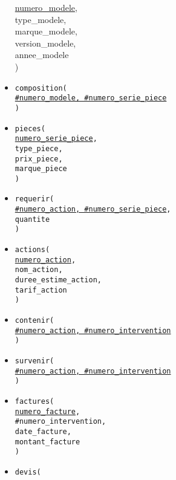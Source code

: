\documentclass[a4paper,11pt]{article} %
\begin{document}
\begin{itemize}[leftmargin=*]
{        \underline{numero\_modele}, \\
        type\_modele, \\
        marque\_modele, \\
        version\_modele, \\
        annee\_modele \\
    )}
    \item \texttt{composition( \\
        \underline{\#numero\_modele, \#numero\_serie\_piece} \\
    )}
    \item \texttt{pieces( \\
        \underline{numero\_serie\_piece}, \\
        type\_piece, \\
        prix\_piece, \\
        marque\_piece \\
    )}
    \item \texttt{requerir( \\
        \underline{\#numero\_action, \#numero\_serie\_piece}, \\
        quantite \\
    )}
    \item \texttt{actions( \\
        \underline{numero\_action}, \\
        nom\_action, \\
        duree\_estime\_action, \\
        tarif\_action \\
    )}
    \item \texttt{contenir( \\
        \underline{\#numero\_action, \#numero\_intervention} \\
    )}
    \item \texttt{survenir( \\
        \underline{\#numero\_action, \#numero\_intervention} \\
    )}
    \item \texttt{factures( \\
        \underline{numero\_facture}, \\
        \#numero\_intervention, \\
        date\_facture, \\
        montant\_facture \\
    )}
    \item \texttt{devis( \\
}
\end{itemize}
\end{document}
